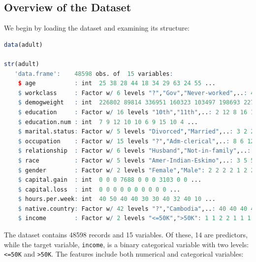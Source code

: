 \documentclass[
]{book}
\newcommand{\passthrough}[1]{#1}
\theoremstyle{definition}
\theoremstyle{definition}
\theoremstyle{definition}
\theoremstyle{definition}
\theoremstyle{remark}
\begin{document}
\subsection*{Overview of the Dataset}\label{overview-of-the-dataset-1}

We begin by loading the dataset and examining its structure:

\begin{lstlisting}[language=R]
data(adult)

str(adult)
   'data.frame':    48598 obs. of  15 variables:
    $ age           : int  25 38 28 44 18 34 29 63 24 55 ...
    $ workclass     : Factor w/ 6 levels "?","Gov","Never-worked",..: 4 4 2 4 1 4 1 5 4 4 ...
    $ demogweight   : int  226802 89814 336951 160323 103497 198693 227026 104626 369667 104996 ...
    $ education     : Factor w/ 16 levels "10th","11th",..: 2 12 8 16 16 1 12 15 16 6 ...
    $ education.num : int  7 9 12 10 10 6 9 15 10 4 ...
    $ marital.status: Factor w/ 5 levels "Divorced","Married",..: 3 2 2 2 3 3 3 2 3 2 ...
    $ occupation    : Factor w/ 15 levels "?","Adm-clerical",..: 8 6 12 8 1 9 1 11 9 4 ...
    $ relationship  : Factor w/ 6 levels "Husband","Not-in-family",..: 4 1 1 1 4 2 5 1 5 1 ...
    $ race          : Factor w/ 5 levels "Amer-Indian-Eskimo",..: 3 5 5 3 5 5 3 5 5 5 ...
    $ gender        : Factor w/ 2 levels "Female","Male": 2 2 2 2 1 2 2 2 1 2 ...
    $ capital.gain  : int  0 0 0 7688 0 0 0 3103 0 0 ...
    $ capital.loss  : int  0 0 0 0 0 0 0 0 0 0 ...
    $ hours.per.week: int  40 50 40 40 30 30 40 32 40 10 ...
    $ native.country: Factor w/ 42 levels "?","Cambodia",..: 40 40 40 40 40 40 40 40 40 40 ...
    $ income        : Factor w/ 2 levels "<=50K",">50K": 1 1 2 2 1 1 1 2 1 1 ...
\end{lstlisting}

The dataset contains 48598 records and 15 variables. Of these, 14 are predictors, while the target variable, \passthrough{\lstinline!income!}, is a binary categorical variable with two levels: \passthrough{\lstinline!<=50K!} and \passthrough{\lstinline!>50K!}. The features include both numerical and categorical variables:
\end{document}
